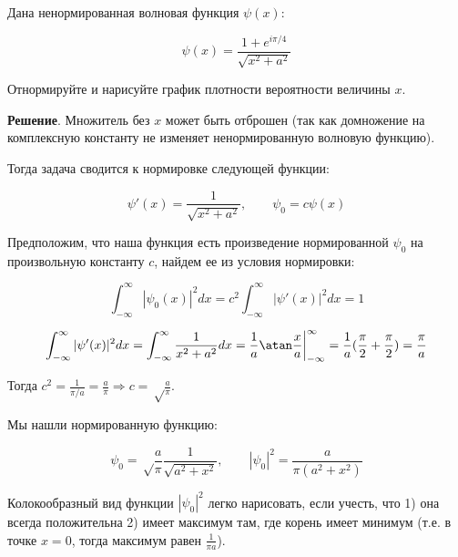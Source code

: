 Дана ненормированная волновая функция $\psi(x)$:

\begin{displaymath}
\psi(x)=\frac{1+e^{i\pi/4}}{\sqrt{x^2+a^2}}
\end{displaymath}

Отнормируйте и нарисуйте график плотности вероятности величины $x$.

\textbf{Решение}. Множитель без \guillemotleft{}$x$\guillemotright{} может быть отброшен (так как домножение на комплексную константу не изменяет ненормированную волновую функцию). 

Тогда задача сводится к нормировке следующей функции:

\begin{displaymath}
\psi'(x)=\frac{1}{\sqrt{x^2+a^2}},\qquad \psi_0=c\psi(x)
\end{displaymath}

Предположим, что наша функция есть произведение нормированной $\psi_0$ на произвольную константу $c$, найдем ее из условия нормировки:

\begin{displaymath}
\int_{-\infty}^{\infty}|\psi_0(x)|^2 dx=
c^2\int_{-\infty}^{\infty}|\psi'(x)|^2 dx=1
\end{displaymath}

\begin{displaymath}
\int_{-\infty}^{\infty}|\psi'(x)|^2 dx=
\int_{-\infty}^{\infty} \frac{1}{x^2+a^2} dx= \frac{1}{a}\atan\frac{x}{a}\bigg|_{-\infty}^{\infty}=
\frac{1}{a}(\frac\pi2+\frac\pi2)=\frac{\pi}{a}
\end{displaymath}

Тогда  $c^2=\frac{1}{\pi/a}=\frac{a}{\pi} \Rightarrow c=\sqrt\frac{a}{\pi}$.

Мы нашли нормированную функцию:

\begin{displaymath}
\psi_0=\sqrt\frac{a}{\pi}\frac{1}{\sqrt{a^2+x^2}},\qquad
|\psi_0|^2=\frac{a}{\pi(a^2+x^2)}
\end{displaymath}

Колокообразный вид функции $|\psi_0|^2$ легко нарисовать,  если учесть, что 1) она всегда положительна 2) имеет максимум там, где корень имеет минимум (т.е. в точке $x=0$, тогда максимум равен $\frac{1}{\pi a}$).

